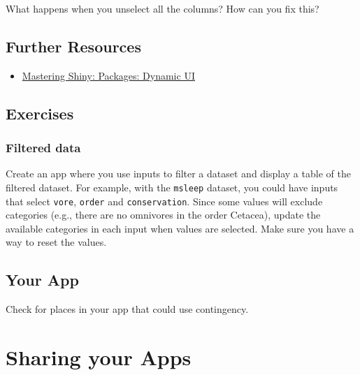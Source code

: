 \documentclass[
  oneside]{book}
\providecommand{\tightlist}{%
  \setlength{\itemsep}{0pt}\setlength{\parskip}{0pt}}
\begin{document}
\begin{try}
What happens when you unselect all the columns? How can you fix this?

\end{try}

\hypertarget{resources-contingency}{%
\section{Further Resources}\label{resources-contingency}}

\begin{itemize}
\tightlist
\item
  \href{https://mastering-shiny.org/action-dynamic.html}{Mastering Shiny: Packages: Dynamic UI}
\end{itemize}

\hypertarget{exercises-contingency}{%
\section{Exercises}\label{exercises-contingency}}

\hypertarget{filtered-data}{%
\subsection*{Filtered data}\label{filtered-data}}

Create an app where you use inputs to filter a dataset and display a table of the filtered dataset. For example, with the \texttt{msleep} dataset, you could have inputs that select \texttt{vore}, \texttt{order} and \texttt{conservation}. Since some values will exclude categories (e.g., there are no omnivores in the order Cetacea), update the available categories in each input when values are selected. Make sure you have a way to reset the values.

\hypertarget{your-app-contingency}{%
\section{Your App}\label{your-app-contingency}}

Check for places in your app that could use contingency.

\hypertarget{sharing}{%
\chapter{Sharing your Apps}\label{sharing}}
\end{document}
